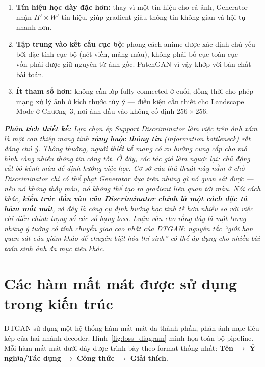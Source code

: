 \begin{enumerate}
    \item \textbf{Tín hiệu học dày đặc hơn:} thay vì một tín hiệu cho cả ảnh, Generator nhận $H' \times W'$ tín hiệu, giúp gradient giàu thông tin không gian và hội tụ nhanh hơn.
    \item \textbf{Tập trung vào kết cấu cục bộ:} phong cách anime được xác định chủ yếu bởi đặc tính cục bộ (nét viền, mảng màu), không phải bố cục toàn cục --- vốn phải được giữ nguyên từ ảnh gốc. PatchGAN vì vậy khớp với bản chất bài toán.
    \item \textbf{Ít tham số hơn:} không cần lớp fully-connected ở cuối, đồng thời cho phép mạng xử lý ảnh ở kích thước tùy ý --- điều kiện cần thiết cho Landscape Mode ở Chương~3, nơi ảnh đầu vào không cố định $256\times256$.
\end{enumerate}

\medskip
\noindent\textit{\textbf{Phân tích thiết kế:} Lựa chọn ép Support Discriminator làm việc trên ảnh xám là một can thiệp mang tính \textbf{ràng buộc thông tin} (information bottleneck) rất đáng chú ý. Thông thường, người thiết kế mạng có xu hướng cung cấp cho mô hình càng nhiều thông tin càng tốt. Ở đây, các tác giả làm ngược lại: chủ động \textit{cắt bỏ} kênh màu để định hướng việc học. Cơ sở của thủ thuật này nằm ở chỗ Discriminator chỉ có thể phạt Generator dựa trên những gì nó \textit{quan sát được} --- nếu nó không thấy màu, nó không thể tạo ra gradient liên quan tới màu. Nói cách khác, \textbf{kiến trúc đầu vào của Discriminator chính là một cách đặc tả hàm mất mát}, và đây là công cụ định hướng học tinh tế hơn nhiều so với việc chỉ điều chỉnh trọng số các số hạng loss. Luận văn cho rằng đây là một trong những ý tưởng có tính chuyển giao cao nhất của DTGAN: nguyên tắc ``giới hạn quan sát của giám khảo để chuyên biệt hóa thí sinh'' có thể áp dụng cho nhiều bài toán sinh ảnh đa mục tiêu khác.}

\section{Các hàm mất mát được sử dụng trong kiến trúc}
\label{sec:loss}

DTGAN sử dụng một hệ thống hàm mất mát đa thành phần, phản ánh mục tiêu kép của hai nhánh decoder. Hình~\ref{fig:loss_diagram} minh họa toàn bộ pipeline. Mỗi hàm mất mát dưới đây được trình bày theo format thống nhất: \textbf{Tên} $\to$ \textbf{Ý nghĩa/Tác dụng} $\to$ \textbf{Công thức} $\to$ \textbf{Giải thích}.

